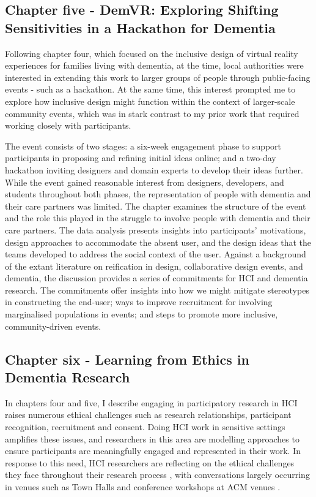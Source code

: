 \subsection{Chapter five - DemVR: Exploring Shifting Sensitivities in a Hackathon for Dementia}
\label{Intro:ChapterFive}
Following chapter four, which focused on the inclusive design of virtual reality experiences for families living with dementia, at the time, local authorities were interested in extending this work to larger groups of people through public-facing events - such as a hackathon. At the same time, this interest prompted me to explore how inclusive design might function within the context of larger-scale community events, which was in stark contrast to my prior work that required working closely with participants.

The event consists of two stages: a six-week engagement phase to support participants in proposing and refining initial ideas online; and a two-day hackathon inviting designers and domain experts to develop their ideas further. While the event gained reasonable interest from designers, developers, and students throughout both phases, the representation of people with dementia and their care partners was limited. The chapter examines the structure of the event and the role this played in the struggle to involve people with dementia and their care partners. The data analysis presents insights into participants’ motivations, design approaches to accommodate the absent user, and the design ideas that the teams developed to address the social context of the user. Against a background of the extant literature on reification in design, collaborative design events, and dementia, the discussion provides a series of commitments for HCI and dementia research. The commitments offer insights into how we might mitigate stereotypes in constructing the end-user; ways to improve recruitment for involving marginalised populations in events; and steps to promote more inclusive, community-driven events. 

\subsection{Chapter six - Learning from Ethics in Dementia Research}
\label{Intro:ChapterSix}
In chapters four and five, I describe engaging in participatory research in HCI raises numerous ethical challenges such as research relationships, participant recognition, recruitment and consent. Doing HCI work in sensitive settings amplifies these issues, and researchers in this area are modelling approaches to ensure participants are meaningfully engaged and represented in their work. In response to this need, HCI researchers are reflecting on the ethical challenges they face throughout their research process \citep{vines_designing_2013}, with conversations largely occurring in venues such as Town Halls \citep{munteanu_sigchi_2019,bruckman_cscw_2017} and conference workshops at ACM venues \citep{davis_ethical_2015,waycott_challenge_2015}.

